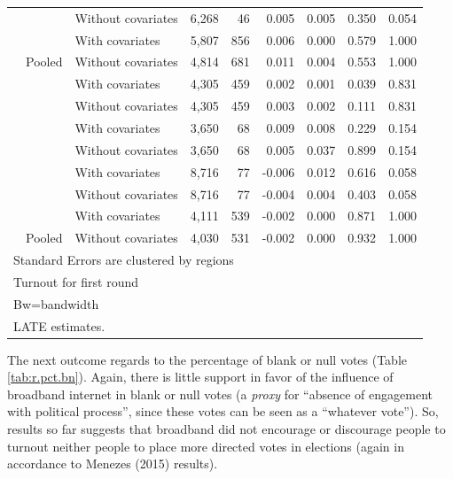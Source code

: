 \documentclass[
  12pt,
]{article}
\begin{document}
\begin{table}[H]
\begin{tabular}[t]{lllrrrrrr}
 & \multirow{-2}{*}{\raggedright\arraybackslash 60000} & Without covariates & 6,268 & 46 & 0.005 & 0.005 & 0.350 & 0.054\\


 &  & With covariates & 5,807 & 856 & 0.006 & 0.000 & 0.579 & 1.000\\


\multirow{-8}{*}{\raggedright\arraybackslash 2010} & Pooled & Without covariates & 4,814 & 681 & 0.011 & 0.004 & 0.553 & 1.000\\
\cmidrule{1-9}
 &  & With covariates & 4,305 & 459 & 0.002 & 0.001 & 0.039 & 0.831\\


 & \multirow{-2}{*}{\raggedright\arraybackslash 20000} & Without covariates & 4,305 & 459 & 0.003 & 0.002 & 0.111 & 0.831\\


 &  & With covariates & 3,650 & 68 & 0.009 & 0.008 & 0.229 & 0.154\\


 & \multirow{-2}{*}{\raggedright\arraybackslash 40000} & Without covariates & 3,650 & 68 & 0.005 & 0.037 & 0.899 & 0.154\\


 &  & With covariates & 8,716 & 77 & -0.006 & 0.012 & 0.616 & 0.058\\


 & \multirow{-2}{*}{\raggedright\arraybackslash 60000} & Without covariates & 8,716 & 77 & -0.004 & 0.004 & 0.403 & 0.058\\


 &  & With covariates & 4,111 & 539 & -0.002 & 0.000 & 0.871 & 1.000\\


\multirow{-8}{*}{\raggedright\arraybackslash 2012} & Pooled & Without covariates & 4,030 & 531 & -0.002 & 0.000 & 0.932 & 1.000\\
\bottomrule
\multicolumn{9}{l}{Standard Errors are clustered by regions}\\
\multicolumn{9}{l}{Turnout for first round}\\
\multicolumn{9}{l}{Bw=bandwidth}\\
\multicolumn{9}{l}{LATE estimates.}\\
\end{tabular}
\end{table}

The next outcome regards to the percentage of blank or null votes (Table
\ref{tab:r.pct.bn}). Again, there is little support in favor of the
influence of broadband internet in blank or null votes (a \emph{proxy}
for ``absence of engagement with political process'', since these votes
can be seen as a ``whatever vote''). So, results so far suggests that
broadband did not encourage or discourage people to turnout neither
people to place more directed votes in elections (again in accordance to
Menezes (2015) results).
\end{document}
